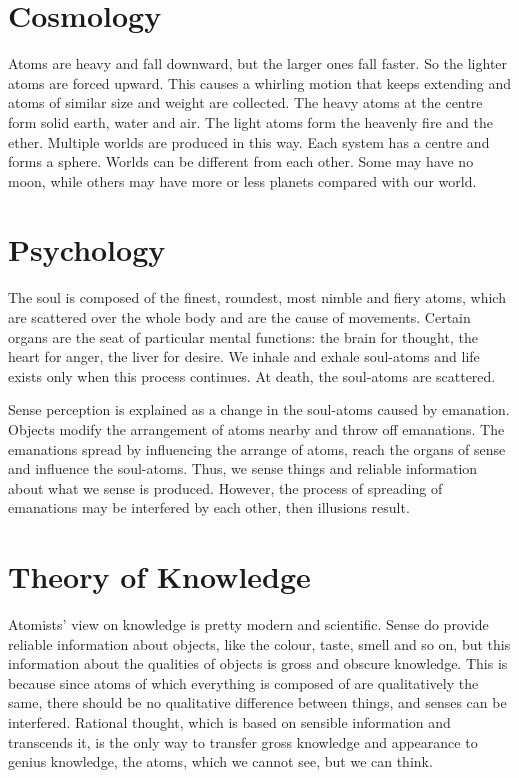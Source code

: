 \documentclass[11pt]{article}
\begin{document}
\section{Cosmology}
Atoms are heavy and fall downward, but the larger ones fall faster. 
So the lighter atoms are forced upward. 
This causes a whirling motion that keeps extending and atoms of similar size and weight are collected. 
The heavy atoms at the centre form solid earth, water and air. 
The light atoms form the heavenly fire and the ether. 
Multiple worlds are produced in this way. 
Each system has a centre and forms a sphere. 
Worlds can be different from each other. 
Some may have no moon, while others may have more or less planets compared with our world. 
  
\section{Psychology}
The soul is composed of the finest, roundest, most nimble and fiery atoms, which are scattered over the whole body and are the cause of movements. 
Certain organs are the seat of particular mental functions: 
the brain for thought, the heart for anger, the liver for desire. 
We inhale and exhale soul-atoms and life exists only when this process continues. 
At death, the soul-atoms are scattered.

\newline

Sense perception is explained as a change in the soul-atoms caused by emanation. 
Objects modify the arrangement of atoms nearby and throw off emanations. 
The emanations spread by influencing the arrange of atoms, reach the organs of sense and influence the soul-atoms. 
Thus, we sense things and reliable information about what we sense is produced. 
However, the process of spreading of emanations may be interfered by each other, then illusions result.
  
\section{Theory of Knowledge}
Atomists’ view on knowledge is pretty modern and scientific. 
Sense do provide reliable information about objects, like the colour, taste, smell and so on, but this information about the qualities of objects is gross and obscure knowledge. 
This is because since atoms of which everything is composed of are qualitatively the same, there should be no qualitative difference between things, and senses can be interfered. 
Rational thought, which is based on sensible information and transcends it, is the only way to transfer gross knowledge and appearance to genius knowledge, the atoms, which we cannot see, but we can think. 
  
\end{document}
